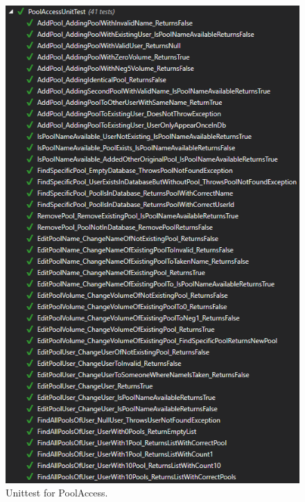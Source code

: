 \begin{figure}[h]
	\centering
	\includegraphics[width=0.8\linewidth]{figs/test/poolaccessunittest}
	\caption{Unittest for PoolAccess.}
	\label{fig:poolaccessunittest}
\end{figure}

